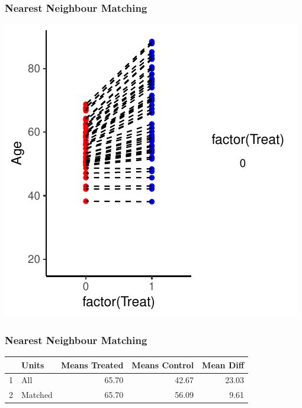 \documentclass[xcolor=x11names,compress]{beamer}\usepackage[]{graphicx}\usepackage[]{color}
\makeatletter
\def\maxwidth{ %
  \ifdim\Gin@nat@width>\linewidth
    \linewidth
  \else
    \Gin@nat@width
  \fi
}
\newenvironment{knitrout}{}{} %
\renewcommand{\(}{\begin{columns}}
\renewcommand{\)}{\end{columns}}
\newcommand{\<}[1]{\begin{column}{#1}}
\renewcommand{\>}{\end{column}}
\makeatother
\begin{document}
\begin{frame}
\frametitle{Nearest Neighbour Matching}
\begin{center}
\begin{knitrout}
\color{fgcolor}
\includegraphics[width=\maxwidth]{figure/nearest_matching_4-1} 

\end{knitrout}
\end{center}
\end{frame}

\begin{frame}
\frametitle{Nearest Neighbour Matching}
\begin{center}
\begin{table}[ht]
\centering
\begin{tabular}{rlrrr}
  \hline
 & Units & Means Treated & Means Control & Mean Diff \\ 
  \hline
1 & All & 65.70 & 42.67 & 23.03 \\ 
  2 & Matched & 65.70 & 56.09 & 9.61 \\ 
   \hline
\end{tabular}
\end{table}

\end{center}
\end{frame}
\end{document}
